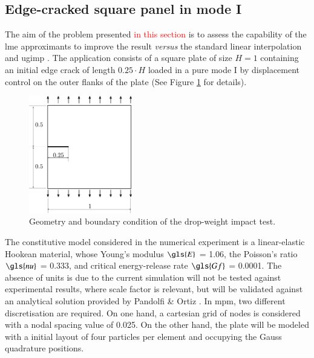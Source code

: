 \documentclass[preprint,12pt,a4paper]{elsarticle}
\begin{document}
\subsection{Edge-cracked square panel in mode I}
\label{sec:3.1}
The aim of the problem presented \textcolor{red}{in this section} is to assess the
capability of the \acrshort{lme} approximants to improve the result \textit{versus} the standard linear interpolation and \acrshort{ugimp}
\cite{Bardenhagen2004}. The application
consists of a square plate of size $H = 1$ containing an initial edge
crack of length $0.25 \cdot H$ loaded in a pure mode I by displacement
control on the outer flanks of the plate (See Figure
\ref{fig:geometry-cracked-panel-mode-I} for details). 
\begin{figure}
  \centering
  \includegraphics[width=0.4\textwidth]{Figure-Mode_I}
  \caption{Geometry and boundary condition of the drop-weight impact test.}
  \label{fig:geometry-cracked-panel-mode-I}
\end{figure}
The constitutive model considered in the numerical experiment is a
linear-elastic Hookean material, whose Young's modulus $\gls{E}$ = 1.06, the Poisson's ratio $\gls{nu}$ = 0.333, and
critical energy-release rate $\gls{Gf}$ = 0.0001. The absence of units is due to the current
simulation will not be tested against experimental results, where scale factor is relevant, but will be validated against an analytical
solution provided by Pandolfi \& Ortiz \cite{Pandolfi_2012}. In \acrshort{mpm}, two different discretisation are required. On one
hand, a cartesian grid of nodes is considered with a nodal spacing value of 0.025. On the other hand, the plate will be modeled with a
initial layout of four particles per element and occupying the Gauss
quadrature positions.\\
\end{document}
